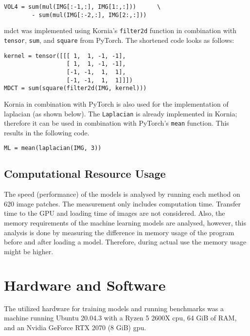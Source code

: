 \begin{lstlisting}
VOL4 = sum(mul(IMG[:-1,:], IMG[1:,:]))      \
        - sum(mul(IMG[:-2,:], IMG[2:,:]))
\end{lstlisting}


\Ac{mdct} was implemented using Kornia's \texttt{filter2d} function in combination with \texttt{tensor}, \texttt{sum}, and \texttt{square} from PyTorch. The shortened code looks as follows:


\begin{lstlisting}
kernel = tensor([[[ 1,  1, -1, -1],
                  [ 1,  1, -1, -1],
                  [-1, -1,  1,  1],
                  [-1, -1,  1,  1]]])
MDCT = sum(square(filter2d(IMG, kernel)))
\end{lstlisting}

Kornia in combination with PyTorch is also used for the implementation of \ac{laplacian} (as shown below). The \texttt{Laplacian} is already implemented in Kornia; therefore it can be used in combination with PyTorch's \texttt{mean} function. This results in the following code.

\begin{lstlisting}
ML = mean(laplacian(IMG, 3))
\end{lstlisting}

\subsection{Computational Resource Usage}
\label{sec:Methods:Evaluation:Computation}

The speed (performance) of the models is analysed by running each method on 620 image patches. The measurement only includes computation time. Transfer time to the GPU and loading time of images are not considered. Also, the memory requirements of the machine learning models are analysed, however, this analysis is done by measuring the difference in memory usage of the program before and after loading a model. Therefore, during actual use the memory usage might be higher.

\section{Hardware and Software}
\label{sec:Methods:Hardware}

The utilized hardware for training models and running benchmarks was a machine running Ubuntu 20.04.3 with a Ryzen 5 2600X \ac{cpu}, 64 GiB of RAM, and an Nvidia GeForce RTX 2070 (8 GiB) \ac{gpu}.
